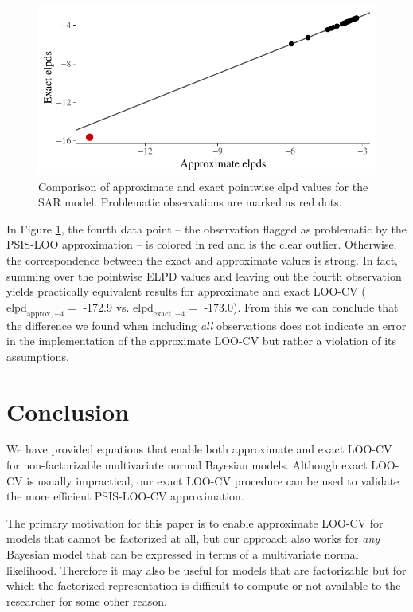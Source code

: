 \documentclass[11pt]{article}
\begin{document}
\begin{figure}
\centering
\includegraphics{elpd-compare-1.pdf}
\caption{Comparison of approximate and exact
pointwise elpd values for the SAR model. Problematic observations are
marked as red dots.}
\label{fig:elpd-compare}
\end{figure}

In Figure \ref{fig:elpd-compare}, the fourth data point -- the
observation flagged as problematic by the PSIS-LOO approximation -- is
colored in red and is the clear outlier. Otherwise, the correspondence
between the exact and approximate values is strong. In fact, summing
over the pointwise ELPD values and leaving out the fourth observation
yields practically equivalent results for approximate and exact LOO-CV
(\(\text{elpd}_{\text{approx},-4} =\) -172.9 vs.
\(\text{elpd}_{\text{exact},-4} =\) -173.0). From this we can conclude
that the difference we found when including \emph{all} observations does
not indicate an error in the implementation of the approximate LOO-CV
but rather a violation of its assumptions.


\section{Conclusion}

We have provided equations that enable both approximate and exact LOO-CV for
non-factorizable multivariate normal Bayesian models. Although exact LOO-CV is
usually impractical, our exact LOO-CV procedure can be used to validate the more
efficient PSIS-LOO-CV approximation.

The primary motivation for this paper is to enable approximate LOO-CV for models
that cannot be factorized at all, but our approach also works for \emph{any}
Bayesian model that can be expressed in terms of a multivariate normal
likelihood. Therefore it may also be useful for models that are factorizable but
for which the factorized representation is difficult to compute or not available
to the researcher for some other reason.






\end{document}
